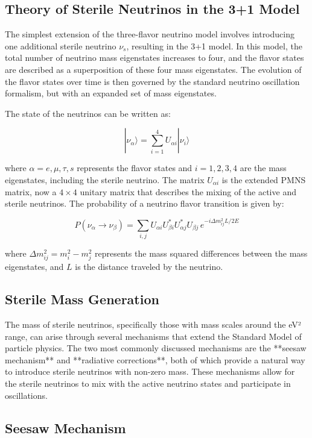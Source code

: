 \documentclass[a4paper,12pt,numbered]{article}
\begin{document}
\subsection{Theory of Sterile Neutrinos in the 3+1 Model}

The simplest extension of the three-flavor neutrino model involves introducing one additional sterile neutrino \( \nu_s \), resulting in the 3+1 model. In this model, the total number of neutrino mass eigenstates increases to four, and the flavor states are described as a superposition of these four mass eigenstates. The evolution of the flavor states over time is then governed by the standard neutrino oscillation formalism, but with an expanded set of mass eigenstates.

The state of the neutrinos can be written as:

\[
|\nu_\alpha\rangle = \sum_{i=1}^{4} U_{\alpha i} |\nu_i\rangle
\]

where \( \alpha = e, \mu, \tau, s \) represents the flavor states and \( i = 1, 2, 3, 4 \) are the mass eigenstates, including the sterile neutrino. The matrix \( U_{\alpha i} \) is the extended PMNS matrix, now a \( 4 \times 4 \) unitary matrix that describes the mixing of the active and sterile neutrinos. The probability of a neutrino flavor transition is given by:

\[
P(\nu_\alpha \to \nu_\beta) = \sum_{i,j} U_{\alpha i} U_{\beta i}^* U_{\alpha j}^* U_{\beta j} \, e^{-i \Delta m^2_{ij} L / 2E}
\]

where \( \Delta m^2_{ij} = m_i^2 - m_j^2 \) represents the mass squared differences between the mass eigenstates, and \( L \) is the distance traveled by the neutrino.

\subsection{Sterile Mass Generation}

The mass of sterile neutrinos, specifically those with mass scales around the eV² range, can arise through several mechanisms that extend the Standard Model of particle physics. The two most commonly discussed mechanisms are the **seesaw mechanism** and **radiative corrections**, both of which provide a natural way to introduce sterile neutrinos with non-zero mass. These mechanisms allow for the sterile neutrinos to mix with the active neutrino states and participate in oscillations.

\subsection{Seesaw Mechanism}
\end{document}

